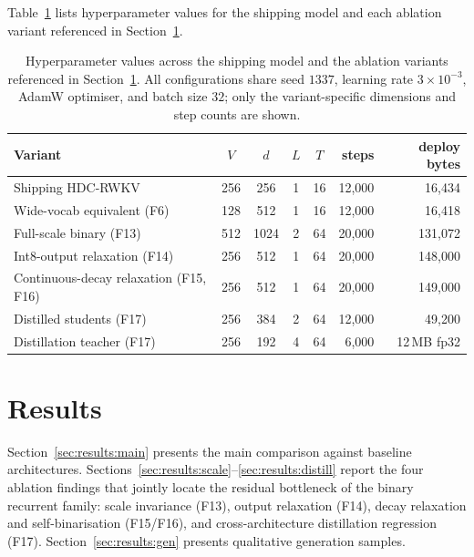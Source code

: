 \documentclass[runningheads]{llncs}
\begin{document}
Table~\ref{tab:hparams} lists hyperparameter values for the shipping
model and each ablation variant referenced in Section~\ref{sec:results}.

\begin{table}[t]
\centering
\caption{Hyperparameter values across the shipping model and the
ablation variants referenced in Section~\ref{sec:results}. All
configurations share seed $1337$, learning rate $3\times 10^{-3}$,
AdamW optimiser, and batch size $32$; only the variant-specific
dimensions and step counts are shown.}
\label{tab:hparams}
\small
\begin{tabular}{@{}lccccrr@{}}
\toprule
Variant                                     & $V$ & $d$  & $L$ & $T$ & steps    & deploy bytes \\
\midrule
Shipping HDC-RWKV                           & 256 & 256  & 1   & 16  & 12{,}000 & 16{,}434 \\
Wide-vocab equivalent (F6)                  & 128 & 512  & 1   & 16  & 12{,}000 & 16{,}418 \\
Full-scale binary (F13)                     & 512 & 1024 & 2   & 64  & 20{,}000 & 131{,}072 \\
Int8-output relaxation (F14)                & 256 & 512  & 1   & 64  & 20{,}000 & 148{,}000 \\
Continuous-decay relaxation (F15, F16)      & 256 & 512  & 1   & 64  & 20{,}000 & 149{,}000 \\
Distilled students (F17)                    & 256 & 384  & 2   & 64  & 12{,}000 & 49{,}200 \\
Distillation teacher (F17)                  & 256 & 192  & 4   & 64  & \phantom{0}6{,}000 & 12\,MB fp32 \\
\bottomrule
\end{tabular}
\end{table}


\section{Results}
\label{sec:results}

Section~\ref{sec:results:main} presents the main comparison against
baseline architectures. Sections~\ref{sec:results:scale}--\ref{sec:results:distill}
report the four ablation findings that jointly locate the residual
bottleneck of the binary recurrent family: scale invariance (F13),
output relaxation (F14), decay relaxation and self-binarisation
(F15/F16), and cross-architecture distillation regression (F17).
Section~\ref{sec:results:gen} presents qualitative generation samples.
\end{document}
